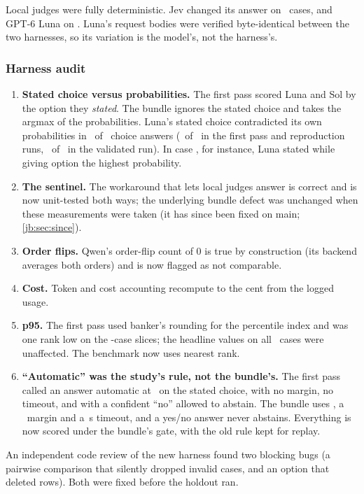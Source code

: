 Local judges were fully deterministic. Jev changed its answer on \JevChangedCases\ cases, and GPT-6
Luna on \LunaChangedCases. Luna's request bodies were verified byte-identical between the two harnesses,
so its variation is the model's, not the harness's.

\subsubsection{Harness audit}

\begin{enumerate}
  \item \textbf{Stated choice versus probabilities.} The first pass scored Luna and Sol by the option
    they \emph{stated}. The bundle ignores the stated choice and takes the argmax of the probabilities.
    Luna's stated choice contradicted its own probabilities in \LunaMismatchK\ of \LunaMismatchN\ choice
    answers (\LunaMismatchFpK\ of \LunaMismatchFpN\ in the first pass and reproduction runs,
    \LunaMismatchDevK\ of \LunaMismatchDevN\ in the validated run). In case , for
    instance, Luna stated  while giving option  the highest probability.
  \item \textbf{The  sentinel.} The workaround that lets local judges answer 
    is correct and is now unit-tested both ways; the underlying bundle defect was unchanged when these
    measurements were taken (it has since been fixed on main; \cref{jb:sec:since}).
  \item \textbf{Order flips.} Qwen's order-flip count of 0 is true by construction (its backend averages
    both orders) and is now flagged as not comparable.
  \item \textbf{Cost.} Token and cost accounting recompute to the cent from the logged usage.
  \item \textbf{p95.} The first pass used banker's rounding for the percentile index and was one rank
    low on the \DevNFresh-case slices; the headline values on all \DevN\ cases were unaffected. The benchmark
    now uses nearest rank.
  \item \textbf{``Automatic'' was the study's rule, not the bundle's.} The first pass called an answer
    automatic at \StudyCutoff\ on the stated choice, with no margin, no timeout, and with a confident
    ``no'' allowed to abstain. The bundle uses \MinP, a \MinMargin\ margin and a \TimeoutS\,s timeout,
    and a yes/no answer never abstains. Everything is now scored under the bundle's gate, with the old
    rule kept for replay.
\end{enumerate}
An independent code review of the new harness found two blocking bugs (a pairwise comparison that
silently dropped invalid cases, and an  option that deleted rows). Both were fixed before
the holdout ran.

